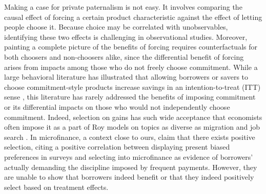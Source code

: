 \documentclass[oneside,11pt]{article}
\begin{document}
Making a case for private paternalism is not easy. It involves comparing the causal effect of forcing a certain product characteristic against the effect of letting people choose it. Because choice may be correlated with unobservables, identifying these two effects is challenging in observational studies.  %
Moreover, painting a complete picture of the benefits of forcing requires counterfactuals for both choosers and non-choosers alike, since the differential benefit of forcing arises from impacts among those who do not freely choose commitment. While a large behavioral literature has illustrated that allowing borrowers or savers to choose commitment-style products increase savings in an intention-to-treat (ITT) sense \citep{thaler2004save, prina2015banking, brune2016facilitating, callen2019headwaters, Pascaline, Ashraf}, this literature has rarely addressed the benefits of imposing commitment or its differential impacts on those who would not independently choose commitment.  
Indeed, selection on gains has such wide acceptance that economists often impose it as a part of Roy models on topics as diverse as migration \citep{borjas1989economic} and job search \citep{lippman1976economics}.
In microfinance, a context close to ours, \citep{Murdoch} claim that there exists positive selection, citing a positive correlation between displaying present biased preferences in surveys and selecting into microfinance as evidence of borrowers' actually demanding the discipline imposed by frequent payments. However, they are unable to show that borrowers indeed benefit or that they indeed positively select based on treatment effects.
\end{document}
